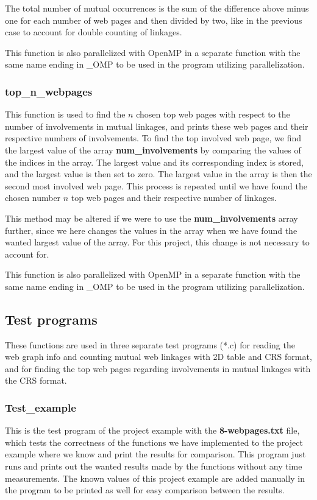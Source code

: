 \documentclass[12pt,a4paper,english]{article}
\begin{document}
The total number of mutual occurrences is the sum of the difference above minus one for each number of web pages and then divided by two, like in the previous case to account for double counting of linkages.

This function is also parallelized with OpenMP in a separate function with the same name ending in \_OMP to be used in the program utilizing parallelization.

\subsubsection{top\_n\_webpages}
This function is used to find the $n$ chosen top web pages with respect to the number of involvements in mutual linkages, and prints these web pages and their respective numbers of involvements. To find the top involved web page, we find the largest value of the array \textbf{num\_involvements} by comparing the values of the indices in the array. The largest value and its corresponding index is stored, and the largest value is then set to zero. The largest value in the array is then the second most involved web page. This process is repeated until we have found the chosen number $n$ top web pages and their respective number of linkages.

This method may be altered if we were to use the \textbf{num\_involvements} array further, since we here changes the values in the array when we have found the wanted largest value of the array. For this project, this change is not necessary to account for.

This function is also parallelized with OpenMP in a separate function with the same name ending in \_OMP to be used in the program utilizing parallelization.

\subsection{Test programs}
\label{subsect:Test_prog}
These functions are used in three separate test programs (*.c) for reading the web graph info and counting mutual web linkages with 2D table and CRS format, and for finding the top web pages regarding involvements in mutual linkages with the CRS format.

\subsubsection{Test\_example}
This is the test program of the project example with the \textbf{8-webpages.txt} file, which tests the correctness of the functions we have implemented to the project example where we know and print the results for comparison. This program just runs and prints out the wanted results made by the functions without any time measurements. The known values of this project example are added manually in the program to be printed as well for easy comparison between the results. 
\end{document}
